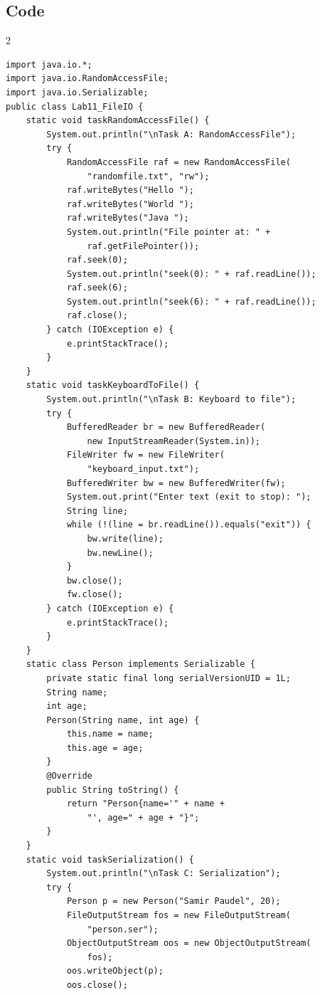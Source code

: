 \documentclass[10pt,a4paper]{article}
\begin{document}
\subsection*{Code}
\begin{multicols}{2}
\begin{lstlisting}
import java.io.*;
import java.io.RandomAccessFile;
import java.io.Serializable;
public class Lab11_FileIO {
    static void taskRandomAccessFile() {
        System.out.println("\nTask A: RandomAccessFile");
        try {
            RandomAccessFile raf = new RandomAccessFile(
                "randomfile.txt", "rw");
            raf.writeBytes("Hello ");
            raf.writeBytes("World ");
            raf.writeBytes("Java ");
            System.out.println("File pointer at: " + 
                raf.getFilePointer());
            raf.seek(0);
            System.out.println("seek(0): " + raf.readLine());
            raf.seek(6);
            System.out.println("seek(6): " + raf.readLine());
            raf.close();
        } catch (IOException e) {
            e.printStackTrace();
        }
    }
    static void taskKeyboardToFile() {
        System.out.println("\nTask B: Keyboard to file");
        try {
            BufferedReader br = new BufferedReader(
                new InputStreamReader(System.in));
            FileWriter fw = new FileWriter(
                "keyboard_input.txt");
            BufferedWriter bw = new BufferedWriter(fw);
            System.out.print("Enter text (exit to stop): ");
            String line;
            while (!(line = br.readLine()).equals("exit")) {
                bw.write(line);
                bw.newLine();
            }
            bw.close();
            fw.close();
        } catch (IOException e) {
            e.printStackTrace();
        }
    }
    static class Person implements Serializable {
        private static final long serialVersionUID = 1L;
        String name;
        int age;
        Person(String name, int age) {
            this.name = name;
            this.age = age;
        }
        @Override
        public String toString() {
            return "Person{name='" + name + 
                "', age=" + age + "}";
        }
    }
    static void taskSerialization() {
        System.out.println("\nTask C: Serialization");
        try {
            Person p = new Person("Samir Paudel", 20);
            FileOutputStream fos = new FileOutputStream(
                "person.ser");
            ObjectOutputStream oos = new ObjectOutputStream(
                fos);
            oos.writeObject(p);
            oos.close();

\end{lstlisting}
\end{multicols}
\end{document}
